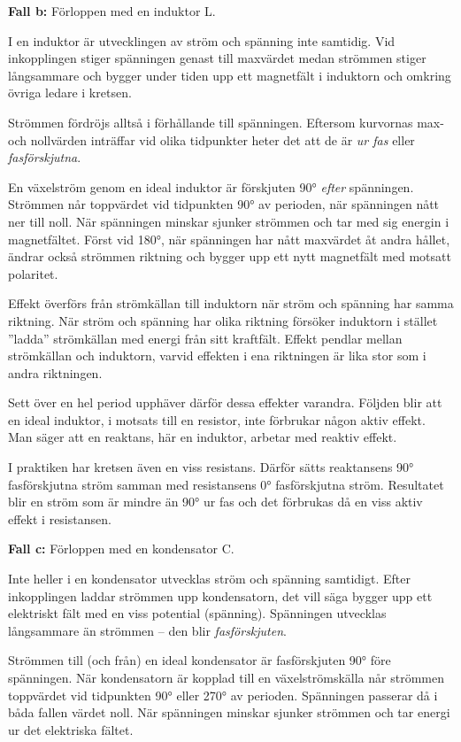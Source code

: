 \textbf{Fall b:} Förloppen med en induktor L.

I en induktor är utvecklingen av ström och spänning inte samtidig.
Vid inkopplingen stiger spänningen genast till maxvärdet medan strömmen stiger
långsammare och bygger under tiden upp ett magnetfält i induktorn och omkring
övriga ledare i kretsen.

Strömmen fördröjs alltså i förhållande till spänningen.
Eftersom kurvornas max- och nollvärden inträffar vid olika tidpunkter heter
det att de är \emph{ur fas} eller \emph{fasförskjutna}.

En växelström genom en ideal induktor är förskjuten \ang{90} \emph{efter}
spänningen.
Strömmen når toppvärdet vid tidpunkten \ang{90} av perioden, när spänningen nått
ner till noll.
När spänningen minskar sjunker strömmen och tar med sig energin i magnetfältet.
Först vid \ang{180}, när spänningen har nått maxvärdet åt andra hållet, ändrar
också strömmen riktning och bygger upp ett nytt magnetfält med motsatt
polaritet.

Effekt överförs från strömkällan till induktorn när ström och spänning har
samma riktning.
När ström och spänning har olika riktning försöker induktorn i stället
''ladda'' strömkällan med energi från sitt kraftfält.
Effekt pendlar mellan strömkällan och induktorn, varvid effekten i
ena riktningen är lika stor som i andra riktningen.

Sett över en hel period upphäver därför dessa effekter varandra.
Följden blir att en ideal induktor, i motsats till en resistor, inte förbrukar
någon aktiv effekt.
Man säger att en reaktans, här en induktor, arbetar med reaktiv effekt.

I praktiken har kretsen även en viss resistans.
Därför sätts reaktansens \ang{90} fasförskjutna ström samman med resistansens
\ang{0} fasförskjutna ström.
Resultatet blir en ström som är mindre än \ang{90} ur fas och det förbrukas då
en viss aktiv effekt i resistansen.

\textbf{Fall c:} Förloppen med en kondensator C.

Inte heller i en kondensator utvecklas ström och spänning samtidigt.
Efter inkopplingen laddar strömmen upp kondensatorn, det vill säga bygger upp
ett elektriskt fält med en viss potential (spänning).
Spänningen utvecklas långsammare än strömmen -- den blir \emph{fasförskjuten}.

Strömmen till (och från) en ideal kondensator är fasförskjuten \ang{90} före
spänningen.
När kondensatorn är kopplad till en växelströmskälla når strömmen toppvärdet vid
tidpunkten \ang{90} eller \ang{270} av perioden.
Spänningen passerar då i båda fallen värdet noll.
När spänningen minskar sjunker strömmen och tar energi ur det elektriska
fältet.

